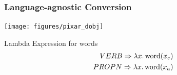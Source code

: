\documentclass[mathserif,12pt]{beamer}
\newcommand \ignore[1]{}
\newcommand{\itype}{{\bf Ind}}
\newcommand{\etype}{{\bf Event}}
\newcommand{\btype}{{\bf Bool}}
\newcommand{\lspace}{.\,}
\begin{document}
\ignore{
\begin{frame}
\frametitle{Language-agnostic Conversion}
\framesubtitle{Substitution}
\vspace{-3.3em}
\begin{center}
\texttt{[image: figures/pixar\_dobj]}

\end{center}

\vspace{1cm}

\begin{block}{Lambda Calculus Basic Types}
\begin{itemize}
  \item Individuals: $\itype$ (also denoted by $._a$)
  \item Events: $\etype$ (also denoted by $._e$)
  \item Truth values: $\btype$
\end{itemize}
\end{block}
\end{frame}
}

\begin{frame}
\frametitle{Language-agnostic Conversion}
\vspace{-2.4em}
\begin{center}
\texttt{[image: figures/pixar\_dobj]}

\end{center}

\vspace{1cm}

\begin{block}{\centering Lambda Expression for words}
\vspace{-0.5cm}
\begin{align*}
  VERB \Rightarrow \lambda x \lspace \hbox{word}(x_e) \\
  PROPN \Rightarrow \lambda x \lspace \hbox{word}(x_a) 
\end{align*}
\vspace{-0.5cm}
\end{block}
\end{frame}
\end{document}
